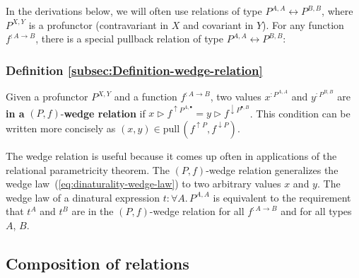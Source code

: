 In the derivations below, we will often use relations of type $P^{A,A}\leftrightarrow P^{B,B}$,
where $P^{X,Y}$ is a profunctor (contravariant in $X$ and covariant
in $Y$). For any function $f^{:A\rightarrow B}$, there is a special
pullback relation of type $P^{A,A}\leftrightarrow P^{B,B}$: 

\subsubsection{Definition \label{subsec:Definition-wedge-relation}\ref{subsec:Definition-wedge-relation}}

Given a profunctor
$P^{X,Y}$ and a function $f^{:A\rightarrow B}$, two values $x^{:P^{A,A}}$
and $y^{:P^{B,B}}$ are \textbf{in a} $\left(P,f\right)$-\textbf{wedge
relation} if $x\triangleright f^{\uparrow P^{A,\bullet}}=y\triangleright f^{\downarrow P^{\bullet,B}}$.
This condition can be written more concisely as $(x,y)\in\text{pull}\,(f^{\uparrow P},f^{\downarrow P})$.

The wedge relation is useful because it comes up often in applications
of the relational parametricity theorem. The $\left(P,f\right)$-wedge
relation generalizes the wedge law~(\ref{eq:dinaturality-wedge-law})
to two arbitrary values $x$ and $y$. The wedge law of a dinatural
expression $t:\forall A.\,P^{A,A}$ is equivalent to the requirement
that $t^{A}$ and $t^{B}$ are in the $\left(P,f\right)$-wedge relation
for all $f^{:A\rightarrow B}$ and for all types $A$, $B$.

\subsection{Composition of relations}

